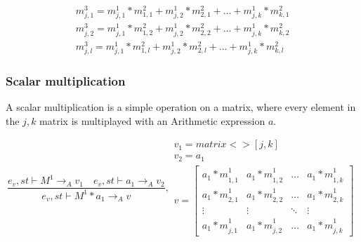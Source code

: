 \begin{minipage}{1.0\textwidth}
\begin{equation*}
\begin{aligned}
{ { m }_{ j,1 }^{ 3 } }  = { { m }_{ j,1 }^{ 1 } } *{ { m }_{ 1,1 }^{ 2 } }+ { { m }_{ j,2 }^{ 1 } } *{ { m }_{ 2,1 }^{ 2 } }+\dots+ { { m }_{ j,k }^{ 1 } } *{ { m }_{ k,1 }^{ 2 } }\\
{ { m }_{ j,2 }^{ 3 } }  = { { m }_{ j,1 }^{ 1 } } *{ { m }_{ 1,2 }^{ 2 } }+ { { m }_{ j,2 }^{ 1 } } *{ { m }_{ 2,2 }^{ 2 } }+\dots+ { { m }_{ j,k }^{ 1 } } *{ { m }_{ k,2 }^{ 2 } }\\
{ { m }_{ j,l }^{ 3 } }  = { { m }_{ j,1 }^{ 1 } } *{ { m }_{ 1,l }^{ 2 } }+ { { m }_{ j,2 }^{ 1 } } *{ { m }_{ 2,l }^{ 2 } }+\dots+ { { m }_{ j,k }^{ 1 } } *{ { m }_{ k,l }^{ 2 } }
\end{aligned}
\end{equation*}
\end{minipage}
\subsubsection{Scalar multiplication}
A scalar multiplication is a simple operation on a matrix, where every element in the $j,k$ matrix is multiplayed with an Arithmetic expression $a$. 

\begin{equation}
	\frac { { e }_{ v },st\vdash { M }^{ 1 }{ \rightarrow  }_{ A }{ v }_{ 1 }\quad { e }_{ v },st\vdash { a }_{ 1 }{ \rightarrow  }_{ A }{ v }_{ 2 } }{ { e }_{ v },st\vdash { M }^{ 1 }\ast { a }_{ 1 }{ \rightarrow  }_{ A }{ v } } ,\begin{matrix} { v }_{ 1 }=matrix<>[j,k] \\ { v }_{ 2 }={ a }_{ 1 } \\ v=\begin{bmatrix} { { a }_{ 1 }*m }_{ 1,1 }^{ 1 } & { { a }_{ 1 }*m }_{ 1,2 }^{ 1 } & \dots  & { { a }_{ 1 }*m }_{ 1,k }^{ 1 } \\
 { { a }_{ 1 }*m }_{ 2,1 }^{ 1 } & { { a }_{ 1 }*m }_{ 2,2 }^{ 1 } & \dots  & { { a }_{ 1 }*m }_{ 2,k }^{ 1 }  \\ \vdots & \vdots & \ddots & \vdots \\ { { a }_{ 1 }*m }_{ j,1 }^{ 1 } & { { a }_{ 1 }*m }_{ j,2 }^{ 1 } & \dots & { { a }_{ 1 }*m }_{ j,k }^{ 1 } \end{bmatrix} \end{matrix}
\end{equation}

